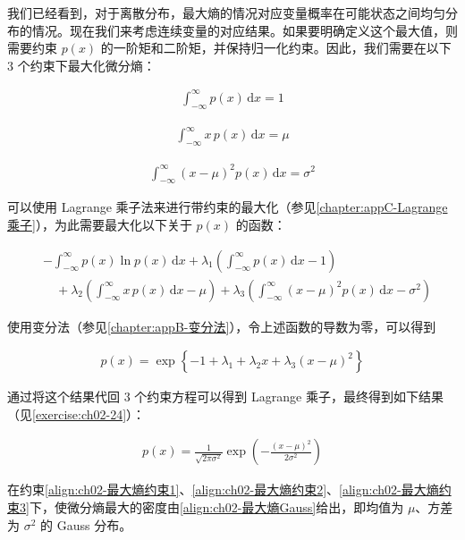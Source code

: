 \documentclass[../../main.tex]{subfiles}
\begin{document}
我们已经看到，对于离散分布，最大熵的情况对应变量概率在可能状态之间均匀分布的情况。现在我们来考虑连续变量的对应结果。如果要明确定义这个最大值，则需要约束 $p(x)$ 的一阶矩和二阶矩，并保持归一化约束。因此，我们需要在以下 $3$ 个约束下最大化微分熵：

\begin{align}
  \int_{-\infty}^{\infty} p(x)\,\mathrm{d}x = 1
  \label{align:ch02-最大熵约束1}
\end{align}

\begin{align}
  \int_{-\infty}^{\infty} x\,p(x)\,\mathrm{d}x = \mu
  \label{align:ch02-最大熵约束2}
\end{align}

\begin{align}
  \int_{-\infty}^{\infty} (x-\mu)^{2}p(x)\,\mathrm{d}x = \sigma^{2}
  \label{align:ch02-最大熵约束3}
\end{align}

可以使用 Lagrange 乘子法来进行带约束的最大化（参见\cref{chapter:appC-Lagrange乘子}），为此需要最大化以下关于 $p(x)$ 的函数：

\begin{align}
  & -\int_{-\infty}^{\infty} p(x)\ln p(x)\,\mathrm{d}x + \lambda_1\left(\int_{-\infty}^{\infty} p(x)\,\mathrm{d}x - 1\right) \nonumber \\
  & \quad + \lambda_2\left(\int_{-\infty}^{\infty} x\,p(x)\,\mathrm{d}x - \mu\right) + \lambda_3\left(\int_{-\infty}^{\infty}(x-\mu)^{2}p(x)\,\mathrm{d}x - \sigma^{2}\right)
  \label{align:ch02-最大熵泛函}
\end{align}

使用变分法（参见\cref{chapter:appB-变分法}），令上述函数的导数为零，可以得到

\begin{align}
  p(x) = \exp\left\{-1 + \lambda_1 + \lambda_2 x + \lambda_3(x-\mu)^{2}\right\}
  \label{align:ch02-最大熵形式}
\end{align}

通过将这个结果代回 $3$ 个约束方程可以得到 Lagrange 乘子，最终得到如下结果（见\cref{exercise:ch02-24}）：

\begin{align}
  p(x) = \frac{1}{\sqrt{2\pi\sigma^{2}}}\exp\left(-\frac{(x-\mu)^{2}}{2\sigma^{2}}\right)
  \label{align:ch02-最大熵Gauss}
\end{align}

\begin{theorem}\label{theorem:ch02-最大熵Gauss}
在约束\eqref{align:ch02-最大熵约束1}、\eqref{align:ch02-最大熵约束2}、\eqref{align:ch02-最大熵约束3}下，使微分熵最大的密度由\eqref{align:ch02-最大熵Gauss}给出，即均值为 $\mu$、方差为 $\sigma^{2}$ 的 Gauss 分布。
\end{theorem}
\end{document}
